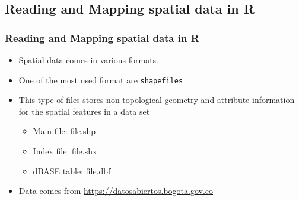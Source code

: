 \documentclass[
  shownotes,
  xcolor={svgnames},
  hyperref={colorlinks,citecolor=DarkBlue,linkcolor=DarkRed,urlcolor=DarkBlue}
   , aspectratio=169]{beamer}
\begin{document}
\subsection{Reading and Mapping spatial data in R}
\begin{frame}[fragile]
\frametitle{Reading and Mapping spatial data in R}

\begin{itemize}
 \item Spatial data comes in various formats. 
 \medskip
 \item One of the most used format are \texttt{shapefiles}
 \medskip
 \item This type of files stores non topological geometry and attribute information for the spatial features in a data set
 \medskip
\begin{itemize}

\item Main file: file.shp
\item Index file: file.shx
\item dBASE table: file.dbf
\end{itemize}
\bigskip
\item Data comes from \url{https://datosabiertos.bogota.gov.co}
\end{itemize}
\end{frame}
\end{document}

